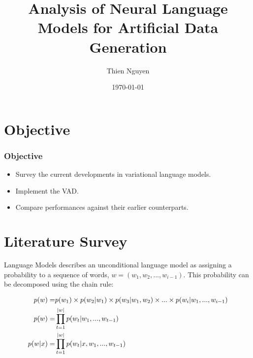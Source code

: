 \documentclass[aspectratio=169, 11pt]{beamer}
\title{Analysis of Neural Language Models for Artificial Data Generation}
\author{Thien Nguyen}
\date{\today}
\begin{document}

\frame{\titlepage}

  
\section{Objective} 
\begin{frame}
  \frametitle{Objective}
  \begin{itemize}
    \item Survey the current developments in variational language models.
    \item Implement the VAD.
    \item Compare performances against their earlier counterparts.
  \end{itemize}
\end{frame}

\section{Literature Survey}
\begin{frame}{Language Models}
    \cite{dyer_conditional_2017} describes an unconditional language model as assigning a probability to a sequence of words,  $w = (w_1, w_2, ..., w_{i-1})$. This probability can be decomposed using the chain rule:

  \begin{align}
    p(w) =& \space p(w_1) \times p(w_2|w_1) \times p(w_3|w_1, w_2) \times ... \times p(w_i|w_1, ..., w_{i-1}) \\
    p(w) =& \prod^{|w|}_{t=1}p(w_t|w_1, ..., w_{t-1}) \\
    p(\boldmath{w}|x) = &{} \prod^{|w|}_{t=1}p(w_t|x,w_1, ..., w_{t-1})
  \end{align}
\end{frame}

\end{document}
